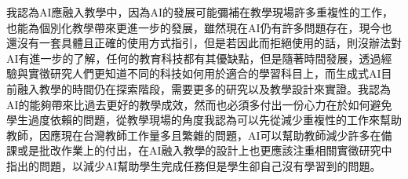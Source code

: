 我認為AI應融入教學中，因為AI的發展可能彌補在教學現場許多重複性的工作，也能為個別化教學帶來更進一步的發展，雖然現在AI仍有許多問題存在，現今也還沒有一套具體且正確的使用方式指引，但是若因此而拒絕使用的話，則沒辦法對AI有進一步的了解，任何的教育科技都有其優缺點，但是隨著時間發展，透過經驗與實徵研究人們更知道不同的科技如何用於適合的學習科目上，而生成式AI目前融入教學的時間仍在探索階段，需要更多的研究以及教學設計來實證。我認為AI的能夠帶來比過去更好的教學成效，然而也必須多付出一份心力在於如何避免學生過度依賴的問題，從教學現場的角度我認為可以先從減少重複性的工作來幫助教師，因應現在台灣教師工作量多且繁雜的問題，AI可以幫助教師減少許多在備課或是批改作業上的付出，在AI融入教學的設計上也更應該注重相關實徵研究中指出的問題，以減少AI幫助學生完成任務但是學生卻自己沒有學習到的問題。
